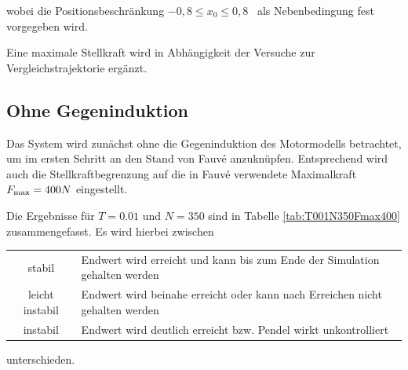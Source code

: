 wobei die Positionsbeschränkung $-0,8 \leq x_0 \leq 0,8$ \ als Nebenbedingung fest vorgegeben wird.

Eine maximale Stellkraft wird in Abhängigkeit der Versuche zur Vergleichstrajektorie ergänzt.


\subsection{Ohne Gegeninduktion}

Das System wird zunächst ohne die Gegeninduktion des Motormodells betrachtet, um im ersten Schritt an den Stand von Fauvé \cite{fauve} anzuknüpfen. Entsprechend wird auch die Stellkraftbegrenzung auf die in Fauvé \cite{fauve} verwendete Maximalkraft $F_{\mathrm{max}}=400N$ eingestellt. 

Die Ergebnisse für $T=0.01$ und $N=350$ sind in Tabelle \ref{tab:T001N350Fmax400} zusammengefasst. Es wird hierbei zwischen 

\begin{center}
	\begin{tabular}{cl}
		stabil & Endwert wird erreicht und kann bis zum Ende der Simulation gehalten werden \\
		leicht instabil & Endwert wird beinahe erreicht oder kann nach Erreichen nicht gehalten werden  \\
		instabil & Endwert wird deutlich erreicht bzw. Pendel wirkt unkontrolliert\\
	\end{tabular}
\end{center}

unterschieden.

